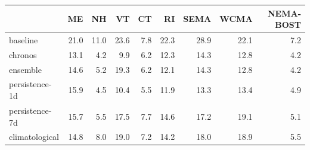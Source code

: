 \begin{tabular}{@{}lrrrrrrrr@{}}
\toprule
 & ME & NH & VT & CT & RI & SEMA & WCMA & NEMA-BOST \\
\midrule
baseline & 21.0 & 11.0 & 23.6 & 7.8 & 22.3 & 28.9 & 22.1 & 7.2 \\
chronos & 13.1 & 4.2 & 9.9 & 6.2 & 12.3 & 14.3 & 12.8 & 4.2 \\
ensemble & 14.6 & 5.2 & 19.3 & 6.2 & 12.1 & 14.3 & 12.8 & 4.2 \\
persistence-1d & 15.9 & 4.5 & 10.4 & 5.5 & 11.9 & 13.3 & 13.4 & 4.9 \\
persistence-7d & 15.7 & 5.5 & 17.5 & 7.7 & 14.6 & 17.2 & 19.1 & 5.1 \\
climatological & 14.8 & 8.0 & 19.0 & 7.2 & 14.2 & 18.0 & 18.9 & 5.5 \\
\bottomrule
\end{tabular}
